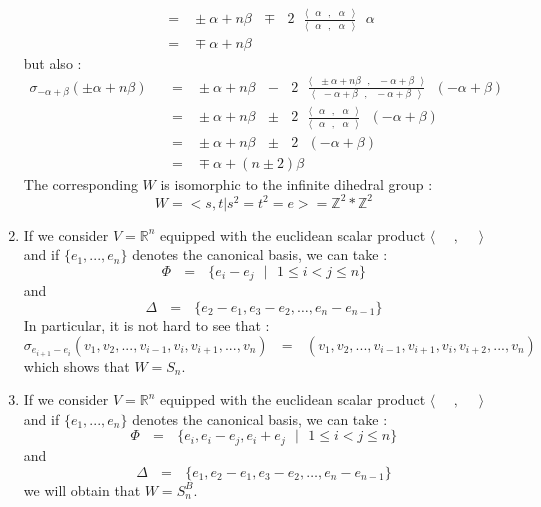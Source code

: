 \documentclass[envcountsame,envcountchap]{svmono}
\newcommand{\Z}{\mathbb Z}
\newcommand{\R}{\mathbb R}
\newcommand{\prods}[2]{\langle\qq #1\qq,\qq#2\qq\rangle}
\newcommand{\qq}{\text{ }}
\begin{document}
\begin{enumerate}
\begin{equation}
\begin{split}
	&=\qq  \pm\alpha +n\beta\qq \mp\qq 2\qq \frac{\prods{\alpha }{\alpha}}{\prods{\alpha}{\alpha}}\qq\alpha \\
	&=\qq \mp \alpha +n\beta
	\end{split}
	\end{equation}
	but also :
	\begin{equation}
	\begin{split}
	\sigma_{-\alpha+\beta}(\pm\alpha+n\beta)\qq &=\qq  \pm\alpha+n\beta\qq -\qq 2\qq \frac{\prods{\pm\alpha+n\beta}{-\alpha+\beta}}{\prods{-\alpha+\beta}{-\alpha+\beta}}\qq(-\alpha+\beta)\\
	&=\qq \pm\alpha+n\beta\qq \pm\qq 2\qq \frac{\prods{\alpha}{\alpha}}{\prods{\alpha}{\alpha}}\qq(-\alpha+\beta)\\
	&=\qq\pm \alpha+n\beta\qq \pm\qq 2\qq (-\alpha+\beta)\\
	&=\qq \mp \alpha +(n\pm 2)\beta
	\end{split}
	\end{equation}
	The corresponding $W$ is isomorphic to the infinite dihedral group :
	$$W=<s,t\lvert s^2=t^2=e>=\Z^2*\Z^2$$
	\item If we consider $V=\R^n$ equipped with the euclidean scalar product  $\prods{}{}$ and if $\{e_1,...,e_n\}$ denotes the canonical basis, we can take :
	\begin{equation}
	\Phi\qq =\qq \{e_i-e_j\qq\lvert\qq 1\leq i<j\leq n\}
	\end{equation}
	and 
	\begin{equation}
	\Delta\qq =\qq \{e_2-e_1,e_3-e_2,\dots,e_n-e_{n-1} \}
	\end{equation}
	In particular, it is not hard to see that :
	\begin{equation}
	\sigma_{e_{i+1}-e_i}(v_1,v_2,...,v_{i-1},v_i,v_{i+1},...,v_n)\qq=\qq (v_1,v_2,...,v_{i-1},v_{i+1},v_i,v_{i+2},...,v_n)
	\end{equation}
	which shows that $W=S_n$.
	\item If we consider $V=\R^n$ equipped with the euclidean scalar product  $\prods{}{}$ and if $\{e_1,...,e_n\}$ denotes the canonical basis, we can take :
	\begin{equation}
	\Phi\qq =\qq \{e_i, e_i-e_j,e_i+e_j\qq\lvert\qq 1\leq i<j\leq n\}
	\end{equation}
	and 
	\begin{equation}
	\Delta\qq =\qq \{e_1,e_2-e_1,e_3-e_2,\dots,e_n-e_{n-1} \}
	\end{equation}
	we will obtain that $W=S_n^B$.
\end{enumerate}
\end{document}
